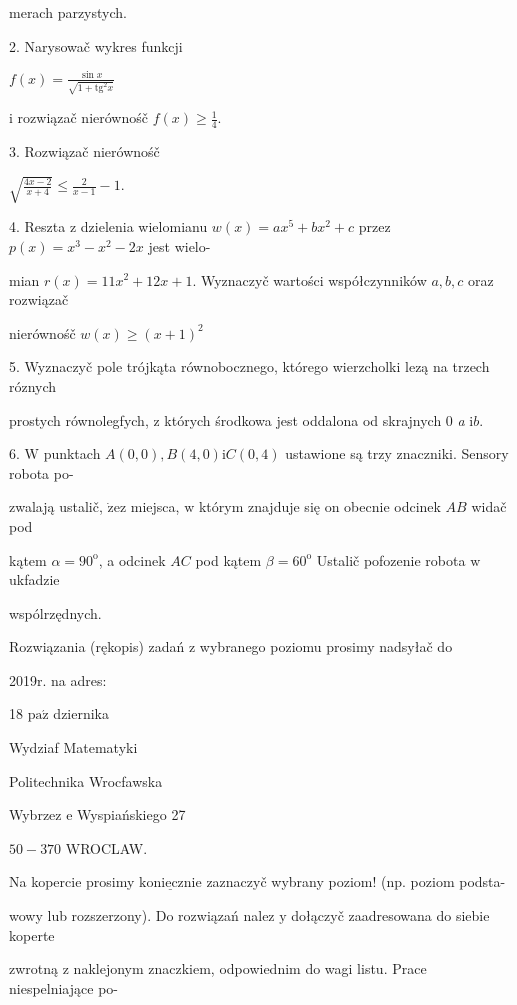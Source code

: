 \documentclass[a4paper,12pt]{article}
\begin{document}
merach parzystych.

2. Narysowač wykres funkcji

$f(x)=\displaystyle \frac{\sin x}{\sqrt{1+\mathrm{t}\mathrm{g}^{2}x}}$

$\mathrm{i}$ rozwiązač nierównośč $f(x)\displaystyle \geq\frac{1}{4}.$

3. Rozwiązač nierównośč

$\displaystyle \sqrt{\frac{4x-2}{x+4}}\leq\frac{2}{x-1}-1.$

4. Reszta $\mathrm{z}$ dzielenia wielomianu $w(x)=ax^{5}+bx^{2}+c$ przez $p(x)=x^{3}-x^{2}-2x$ jest wielo-

mian $r(x)=11x^{2}+12x+1$. Wyznaczyč wartości współczynników $a, b, c$ oraz rozwiązač

nierównośč $w(x)\geq(x+1)^{2}$

5. Wyznaczyč pole trójkąta równobocznego, którego wierzcholki lezą na trzech róznych

prostych równolegfych, $\mathrm{z}$ których środkowa jest oddalona od skrajnych $0$ {\it a} $\mathrm{i}b.$

6. $\mathrm{W}$ punktach $A(0,0), B(4,0) \mathrm{i}C(0,4)$ ustawione są trzy znaczniki. Sensory robota po-

zwalają ustalič, $\dot{\mathrm{z}}\mathrm{e}\mathrm{z}$ miejsca, $\mathrm{w}$ którym znajduje się on obecnie odcinek $AB$ widač pod

kątem $\alpha=90^{\mathrm{o}}$, a odcinek $AC$ pod kątem $\beta=60^{\mathrm{o}}$ Ustalič pofozenie robota $\mathrm{w}$ ukfadzie

wspólrzędnych.

Rozwiązania (rękopis) zadań z wybranego poziomu prosimy nadsyłač do

2019r. na adres:

18 $\mathrm{p}\mathrm{a}\acute{\mathrm{z}}$ dziernika

Wydziaf Matematyki

Politechnika Wrocfawska

Wybrzez $\mathrm{e}$ Wyspiańskiego 27

$50-370$ WROCLAW.

Na kopercie prosimy $\underline{\mathrm{k}\mathrm{o}\mathrm{n}\mathrm{i}\mathrm{e}\mathrm{c}\mathrm{z}\mathrm{n}\mathrm{i}\mathrm{e}}$ zaznaczyč wybrany poziom! (np. poziom podsta-

wowy lub rozszerzony). Do rozwiązań nalez $\mathrm{y}$ dołączyč zaadresowana do siebie koperte

zwrotną $\mathrm{z}$ naklejonym znaczkiem, odpowiednim do wagi listu. Prace niespelniające po-
\end{document}

